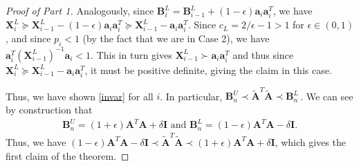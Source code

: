 \documentclass{toc}
\newcommand{\bv}[1]{\mathbf{#1}}
\begin{document}
\begin{proof}[Proof of  Part 1]
Analogously, since $\bv{B}_i^L = \bv{B}_{i-1}^L + (1-\epsilon) \bv{a}_i \bv{a}_i^T$, we have $\bv{X}_{i}^L \succeq \bv{X}_{i-1}^L - (1-\epsilon) \bv{a}_i \bv{a}_i^T \succeq  \bv{X}_{i-1}^L-\bv{a}_i \bv{a}_i^T$. Since $c_L = 2/\epsilon - 1 > 1$ for $\epsilon \in (0,1)$, and since $p_i < 1$ (by the fact that we are in Case 2), we have $\bv{a}_i^T (\bv{X}^L_{i-1})^{-1} \bv{a}_i < 1$. This in turn gives $\bv{X}^L_{i-1} \succ \bv{a}_i \bv{a}_i^T $ and thus  since  $\bv{X}_{i}^L \succeq \bv{X}_{i-1}^L-\bv{a}_i \bv{a}_i^T$, it must be positive definite, giving the claim in this case.

Thus, we have shown \eqref{invar} for all $i$. In particular, $\bv{B}^U_n \prec  \bv{\tilde A}^T \bv{\tilde A} \prec \bv{B}^L_n$\,. We can see by  construction that
\begin{align*}
\bv{B}^U_n = (1+\epsilon) \bv{A}^T \bv{A} + \delta \bv{I}\text{ and }
\bv{B}^L_n = (1-\epsilon) \bv{A}^T \bv{A} - \delta \bv{I}.
\end{align*}
Thus, we have $(1-\epsilon) \bv{A}^T \bv{A} - \delta \bv{I} \prec \bv{\tilde A}^T \bv{\tilde A}  \prec (1+\epsilon) \bv{A}^T \bv{A} + \delta \bv{I}$, which gives the first claim of the theorem.
\end{proof}
\end{document}
